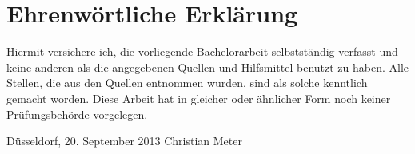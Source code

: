\chapter*{Ehrenwörtliche Erklärung}

Hiermit versichere ich, die vorliegende Bachelorarbeit selbstständig 
verfasst und keine anderen als die angegebenen Quellen und Hilfsmittel
benutzt zu haben.
Alle Stellen, die aus den Quellen entnommen
wurden, sind als solche kenntlich gemacht worden. Diese Arbeit hat in
gleicher oder ähnlicher Form noch keiner Prüfungsbehörde vorgelegen.

\vspace{3cm}

\noindent Düsseldorf, 20. September 2013 \hfill Christian Meter
